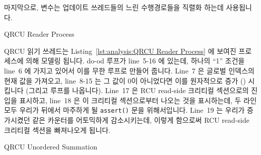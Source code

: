 마지막으로,  변수는 업데이트 쓰레드들의 느린 수행경로들을 직렬화
하는데 사용됩니다.
\iffalse

Finally, the \co{mutex} variable is used to serialize updaters' slowpaths.
\fi

\begin{listing}[htbp]

\caption{QRCU Reader Process}
\label{lst:formal:QRCU Reader Process}
\end{listing}

QRCU 읽기 쓰레드는
Listing~\ref{lst:analysis:QRCU Reader Process} 에 보여진 
프로세스에 의해 모델링 됩니다.
do-od 루프가 line~5-16 에 있는데, 하나의 ``1'' 조건을 line~6 에 가지고 있어서
이를 무한 루프로 만들어 줍니다.
Line~7 은 글로벌 인덱스의 현재 값을 가져오고, line~8-15 는 그 값이 0이
아니었다면 이를 원자적으로 증가 () 시킵니다 (그리고
루프를 나옵니다).
Line~17 은 RCU read-side 크리티컬 섹션으로의 진입을 표시하고, line~18 은 이
크리티컬 섹션으로부터 나오는 것을 표시하는데, 두 라인 모두 우리가 뒤에서
마주하게 될 {\tt assert()} 문을 위해서입니다.
Line~19 는 우리가 증가시켰던 같은 카운터를 어토믹하게 감소시키는데, 이렇게
함으로써 RCU read-side 크리티컬 섹션을 빠져나오게 됩니다.
\iffalse

\begin{lineref}[ln:formal:promela:qrcu:reader]
QRCU readers are modeled by the \co{qrcu_reader()} process shown in
Listing~\ref{lst:formal:QRCU Reader Process}.
A \co{do-od} loop spans lines~\lnref{do}-\lnref{od},
with a single guard of ``1''
on line~\lnref{one} that makes it an infinite loop.
Line~\lnref{curidx} captures the current value of the global index,
and lines~\lnref{atm:b}-\lnref{atm:e}
atomically increment it (and break from the infinite loop)
if its value was non-zero (\co{atomic_inc_not_zero()}).
Line~\lnref{cs:entry} marks entry into the RCU read-side critical section, and
line~\lnref{cs:exit} marks exit from this critical section,
both lines for the benefit of
the \co{assert()} statement that we shall encounter later.
Line~\lnref{atm:dec} atomically decrements the same counter that we incremented,
thereby exiting the RCU read-side critical section.
\end{lineref}
\fi

\begin{listing}[htbp]

\caption{QRCU Unordered Summation}
\label{lst:formal:QRCU Unordered Summation}
\end{listing}

